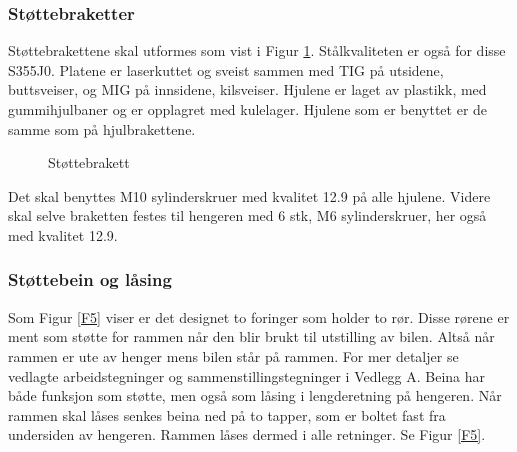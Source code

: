 \subsubsection{Støttebraketter}

Støttebrakettene skal utformes som vist i Figur \ref{F4}. Stålkvaliteten er også for disse S355J0. Platene er laserkuttet og sveist sammen med TIG på utsidene, buttsveiser, og MIG på innsidene, kilsveiser. Hjulene er laget av plastikk, med gummihjulbaner og er opplagret med kulelager. Hjulene som er benyttet er de samme som på hjulbrakettene.

\begin{figure}[H]
\centering   
{}
\caption{Støttebrakett}
\label{F4}
\end{figure}

Det skal benyttes M10 sylinderskruer med kvalitet 12.9 på alle hjulene. Videre skal selve braketten festes til hengeren med 6 stk, M6 sylinderskruer, her også med kvalitet 12.9.    

\subsubsection{Støttebein og låsing}

Som Figur \ref{F5} viser er det designet to foringer som holder to rør. Disse rørene er ment som støtte for rammen når den blir brukt til utstilling av bilen. Altså når rammen er ute av henger mens bilen står på rammen. For mer detaljer se vedlagte arbeidstegninger og sammenstillingstegninger i Vedlegg A. Beina har både funksjon som støtte, men også som låsing i lengderetning på hengeren. Når rammen skal låses senkes beina ned på to tapper, som er boltet fast fra undersiden av hengeren. Rammen låses dermed i alle retninger. Se Figur \ref{F5}.

